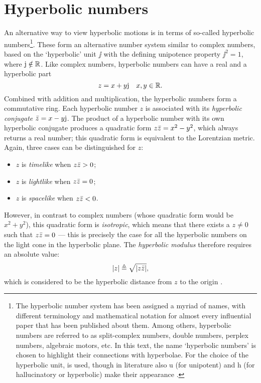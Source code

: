 \section{Hyperbolic numbers}
\label{sec:hyperbolic_numbers}
An alternative way to view hyperbolic motions is in terms of so-called hyperbolic numbers\footnote{The hyperbolic number system has been assigned a myriad of names, with different terminology and mathematical notation for almost every influential paper that has been published about them. Among others, hyperbolic numbers are referred to as split-complex numbers, double numbers, perplex numbers, algebraic motors, etc. In this text, the name `hyperbolic numbers' is chosen to highlight their connections with hyperbolae. For the choice of the hyperbolic unit,  is used, though in literature also \(\mathrm{u}\) (for unipotent) and \(\mathrm{h}\) (for hallucinatory or hyperbolic) make their appearance \cite{Fjelstad1986, Sobczyk1995, Motter1998, Harkin2004}.}. These form an alternative number system similar to complex numbers, based on the `hyperbolic' unit \(\jj\) with the defining unipotence property \(\jj^2 = 1\), where \(\mathrm{j} \notin \mathbb{R}\). Like complex numbers, hyperbolic numbers can have a real and a hyperbolic part
\[
     z = x + y\mathrm{j} \quad x, y \in \mathbb{R}.
\]
Combined with addition and multiplication, the hyperbolic numbers form a commutative ring. Each hyperbolic number \(z\) is associated with its \emph{hyperbolic conjugate} \(\bar{z} = x - y\mathrm{j}\). The product of a hyperbolic number with its own hyperbolic conjugate produces a quadratic form \(z\bar{z} = x^2 - y^2\), which always returns a real number; this quadratic form is equivalent to the Lorentzian metric. Again, three cases can be distinguished for \(z\):
\begin{itemize}[topsep=0.3ex,itemsep=0.3ex]
    \item $z$ is \emph{timelike} when \(z\bar{z} > 0\);
    \item $z$ is \emph{lightlike} when \(z\bar{z} = 0\);
    \item $z$ is \emph{spacelike} when \(z\bar{z} < 0\).
\end{itemize}
However, in contrast to complex numbers (whose quadratic form would be \(x^2 + y^2\)), this quadratic form is \emph{isotropic}, which means that there exists a \(z \neq 0\) such that \(z\bar{z} = 0\) --- this is precisely the case for all the hyperbolic numbers on the light cone in the hyperbolic plane. The \emph{hyperbolic modulus} therefore requires an absolute value:
\[
    \abs{z} \triangleq \sqrt{\abs{z\bar{z}}},
\]
which is considered to be the hyperbolic distance from \(z\) to the origin \cite{Sobczyk1995}.


